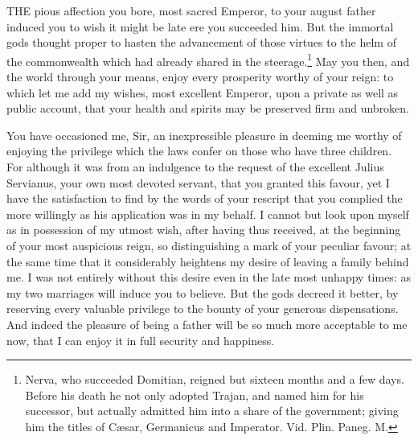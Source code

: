 THE pious affection you bore, most sacred Emperor, to your august father
induced you to wish it might be late ere you succeeded him. But the
immortal gods thought proper to hasten the advancement of those virtues to
the helm of the commonwealth which had already shared in the steerage.\footnote{Nerva, who succeeded
Domitian, reigned but sixteen months and a few days. Before his death he
not only adopted Trajan, and named him for his successor, but actually
admitted him into a share of the government; giving him the titles of
Cæsar, Germanicus and Imperator. Vid. Plin. Paneg. M.}
May you then, and the world through your means, enjoy every prosperity
worthy of your reign: to which let me add my wishes, most excellent
Emperor, upon a private as well as public account, that your health and
spirits may be preserved firm and unbroken.


You have occasioned me, Sir, an inexpressible pleasure in deeming me
worthy of enjoying the privilege which the laws confer on those who have
three children. For although it was from an indulgence to the request of
the excellent Julius Servianus, your own most devoted servant, that you
granted this favour, yet I have the satisfaction to find by the words of
your rescript that you complied the more willingly as his application was
in my behalf. I cannot but look upon myself as in possession of my utmost
wish, after having thus received, at the beginning of your most auspicious
reign, so distinguishing a mark of your peculiar favour; at the same time
that it considerably heightens my desire of leaving a family behind me. I
was not entirely without this desire even in the late most unhappy times:
as my two marriages will induce you to believe. But the gods decreed it
better, by reserving every valuable privilege to the bounty of your
generous dispensations. And indeed the pleasure of being a father will be
so much more acceptable to me now, that I can enjoy it in full security
and happiness.


